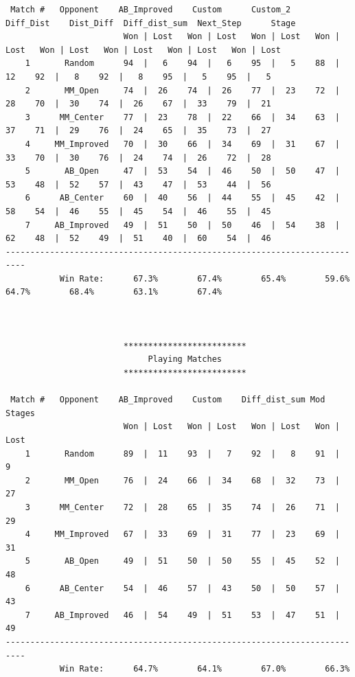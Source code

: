 \documentclass[a4paper,12pt]{article}
\begin{document}
\begin{verbatim}
 Match #   Opponent    AB_Improved    Custom      Custom_2     Diff_Dist    Dist_Diff  Diff_dist_sum  Next_Step      Stage    
                        Won | Lost   Won | Lost   Won | Lost   Won | Lost   Won | Lost   Won | Lost   Won | Lost   Won | Lost 
    1       Random      94  |   6    94  |   6    95  |   5    88  |  12    92  |   8    92  |   8    95  |   5    95  |   5  
    2       MM_Open     74  |  26    74  |  26    77  |  23    72  |  28    70  |  30    74  |  26    67  |  33    79  |  21  
    3      MM_Center    77  |  23    78  |  22    66  |  34    63  |  37    71  |  29    76  |  24    65  |  35    73  |  27  
    4     MM_Improved   70  |  30    66  |  34    69  |  31    67  |  33    70  |  30    76  |  24    74  |  26    72  |  28  
    5       AB_Open     47  |  53    54  |  46    50  |  50    47  |  53    48  |  52    57  |  43    47  |  53    44  |  56  
    6      AB_Center    60  |  40    56  |  44    55  |  45    42  |  58    54  |  46    55  |  45    54  |  46    55  |  45  
    7     AB_Improved   49  |  51    50  |  50    46  |  54    38  |  62    48  |  52    49  |  51    40  |  60    54  |  46  
--------------------------------------------------------------------------
           Win Rate:      67.3%        67.4%        65.4%        59.6%        64.7%        68.4%        63.1%        67.4%    



                        *************************                         
                             Playing Matches                              
                        *************************                         

 Match #   Opponent    AB_Improved    Custom    Diff_dist_sum Mod Stages  
                        Won | Lost   Won | Lost   Won | Lost   Won | Lost 
    1       Random      89  |  11    93  |   7    92  |   8    91  |   9  
    2       MM_Open     76  |  24    66  |  34    68  |  32    73  |  27  
    3      MM_Center    72  |  28    65  |  35    74  |  26    71  |  29  
    4     MM_Improved   67  |  33    69  |  31    77  |  23    69  |  31  
    5       AB_Open     49  |  51    50  |  50    55  |  45    52  |  48  
    6      AB_Center    54  |  46    57  |  43    50  |  50    57  |  43  
    7     AB_Improved   46  |  54    49  |  51    53  |  47    51  |  49  
--------------------------------------------------------------------------
           Win Rate:      64.7%        64.1%        67.0%        66.3%    





\end{verbatim}
\end{document}
